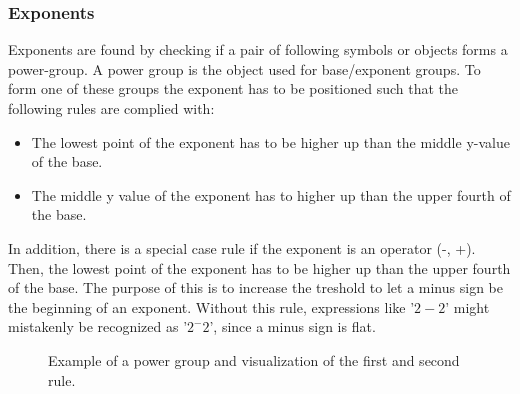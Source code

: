 \subsubsection{Exponents}
\label{interpretation-exponents}

Exponents are found by checking if a pair of following symbols or objects forms a power-group. A power group is the object used for base/exponent groups. To form one of these groups the exponent has to be positioned such that the following rules are complied with:
\begin{itemize}
    \setlength\itemsep{0em}
    \item The lowest point of the exponent has to be higher up than the middle y-value of the base.
    \item The middle y value of the exponent has to higher up than the upper fourth of the base.
\end{itemize}
In addition, there is a special case rule if the exponent is an operator (-, +). Then, the lowest point of the exponent has to be higher up than the upper fourth of the base. The purpose of this is to increase the treshold to let a minus sign be the beginning of an exponent. Without this rule, expressions like '$2-2$' might mistakenly be recognized as '$2^{-}2$', since a minus sign is flat.

\begin{figure}[H]
\centering
{}
\caption{Example of a power group and visualization of the first and second rule.}
\end{figure}

